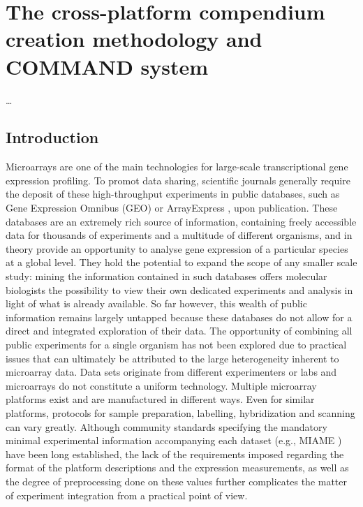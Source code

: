 \chapter{The cross-platform compendium creation methodology and COMMAND 
system}\label{ch:command}

\ldots

\instructionsintroduction

\section{Introduction}

Microarrays are one of the main technologies for large-scale transcriptional 
gene expression profiling. 
To promot data sharing, scientific journals generally require the 
deposit of these high-throughput experiments in public databases, such as Gene 
Expression Omnibus (GEO) \cite{Barrett2011} or ArrayExpress 
\cite{Parkinson2009}, upon publication. 
These databases are an extremely rich source of information, containing freely 
accessible data for thousands of experiments and a multitude of different 
organisms, and in theory provide an opportunity to analyse gene expression of a 
particular species at a global level. 
They hold the potential to expand the scope of any smaller scale study: 
mining the information contained in such databases offers molecular biologists 
the possibility to view their own dedicated experiments and analysis in light 
of what is already available. 
So far however, this wealth of public information remains largely untapped 
because these databases do not allow for a direct and integrated exploration of 
their data. 
The opportunity of combining all public experiments for a single organism has 
not been explored due to practical issues that can ultimately be attributed to 
the large heterogeneity inherent to microarray data. 
Data sets originate from different experimenters or labs and microarrays do not 
constitute a uniform technology. 
Multiple microarray platforms exist and are manufactured in different ways. 
Even for similar platforms, protocols for sample preparation, labelling, 
hybridization and scanning can vary greatly. 
Although community standards specifying the mandatory minimal experimental 
information accompanying each dataset (e.g., MIAME \cite{Brazma2001}) have been 
long established, the lack of the requirements \cite{Brazma2009} imposed 
regarding the format of the platform descriptions and the expression 
measurements, as well as the degree of preprocessing done on these values 
further complicates the matter of experiment integration from a practical point 
of view. 


